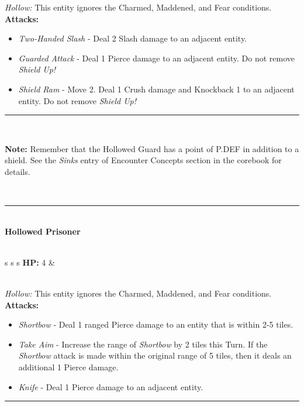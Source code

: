 \emph{Hollow:} This entity ignores the Charmed, Maddened, and Fear conditions.\\

\textbf{Attacks:}
\begin{itemize}
\item \emph{Two-Handed Slash} - Deal 2 Slash damage to an adjacent entity.
\item \emph{Guarded Attack} - Deal 1 Pierce damage to an adjacent entity. Do not remove \emph{Shield Up!}
\item \emph{Shield Ram} - Move 2. Deal 1 Crush damage and Knockback 1 to an adjacent entity. Do not remove \emph{Shield Up!}
\end{itemize}
\hrule
\ \\
\begin{tcolorbox}
\textbf{Note:} Remember that the Hollowed Guard has a point of P.DEF in addition to a shield. See the \emph{Sinks} entry of Encounter Concepts section in the corebook for details.
\end{tcolorbox}
\ \\
\hrule
\ \\
{\large \textbf{Hollowed Prisoner}}\\\\
\begin{tabular}{s s s}
\textbf{HP:} 4 & \\
\end{tabular}\\

\emph{Hollow:} This entity ignores the Charmed, Maddened, and Fear conditions.\\

\textbf{Attacks:}
\begin{itemize}
\item \emph{Shortbow} - Deal 1 ranged Pierce damage to an entity that is within 2-5 tiles.
\item \emph{Take Aim} - Increase the range of \emph{Shortbow} by 2 tiles this Turn. If the \emph{Shortbow} attack is made within the original range of 5 tiles, then it deals an additional 1 Pierce damage.
\item \emph{Knife} - Deal 1 Pierce damage to an adjacent entity.
\end{itemize}
\hrule
\ \\

